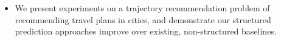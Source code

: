 \begin{itemize}[noitemsep,leftmargin=12pt]

	\item We present experiments on a trajectory recommendation problem of recommending travel plans in cities, and demonstrate our structured prediction approaches improve over existing, non-structured baselines. %
\end{itemize}

